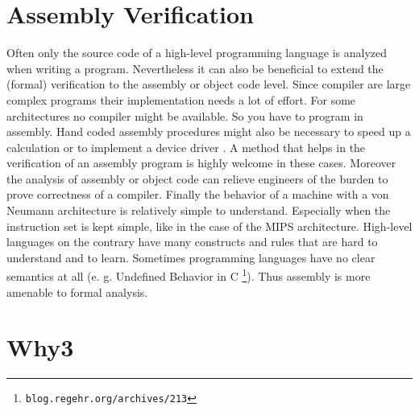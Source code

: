 \section{Assembly Verification}

Often only the source code of a high-level programming language is 
analyzed when writing a program. Nevertheless it can also be beneficial
to extend the (formal) verification to the assembly or object code level.
Since compiler are large complex programs their implementation needs a
lot of effort. For some architectures no compiler might be available. So
you have to program in assembly. Hand coded assembly procedures might
also be necessary to speed up a calculation or to implement a device
driver \cite[p. 4 -- 8]{armb}. A method that helps in the verification of an assembly
program is highly welcome in these cases. Moreover the analysis of assembly
or object code can relieve engineers of the burden to prove correctness
of a compiler.
Finally the behavior of a machine with a von Neumann architecture is 
relatively simple to understand. Especially when the instruction set is
kept simple, like in the case of the MIPS architecture. High-level 
languages on the contrary have many constructs and rules that are hard
to understand and to learn. Sometimes programming languages have no clear
semantics at all (e. g. Undefined Behavior in C 
\footnote{\verb"blog.regehr.org/archives/213"}). Thus assembly
is more amenable to formal analysis.

\section{Why3}

